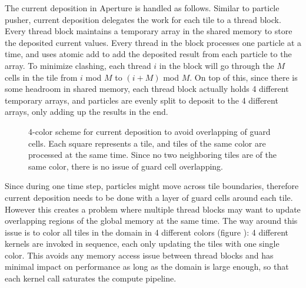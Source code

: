 The current deposition in Aperture is handled as follows. Similar to particle
pusher, current deposition delegates the work for each tile to a thread block.
Every thread block maintains a temporary array in the shared memory to store the
deposited current values. Every thread in the block processes one particle at a
time, and uses atomic add to add the deposited result from each particle to the
array. To minimize clashing, each thread $i$ in the block will go through the
$M$ cells in the tile from $i$ mod $M$ to $(i + M)$ mod $M$. On top of this,
since there is some headroom in shared memory, each thread block actually holds
4 different temporary arrays, and particles are evenly split to deposit to the 4
different arrays, only adding up the results in the end.

\begin{figure}[h]
  \centering
  \caption[4-color scheme for current deposition to avoid overlapping of guard
    cells.]{4-color scheme for current deposition to avoid overlapping of guard
    cells. Each square represents a tile, and tiles of the same color are
    processed at the same time. Since no two neighboring tiles are of the same
    color, there is no issue of guard cell overlapping.}
  \label{fig:4-color-scheme}
\end{figure}

Since during one time step, particles might move across tile boundaries,
therefore current deposition needs to be done with a layer of guard cells around
each tile. However this creates a problem where multiple thread blocks may want
to update overlapping regions of the global memory at the same time. The way
around this issue is to color all tiles in the domain in 4 different colors
(figure ): 4 different kernels are invoked in sequence, each only updating the
tiles with one single color. This avoids any memory access issue between thread
blocks and has minimal impact on performance as long as the domain is large
enough, so that each kernel call saturates the compute pipeline.

